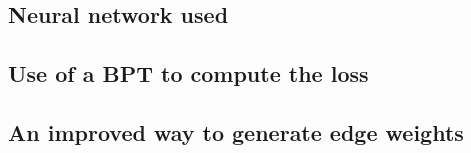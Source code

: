 \subsection{Neural network used}



\subsection{Use of a BPT to compute the loss}


\subsection{An improved way to generate edge weights}
